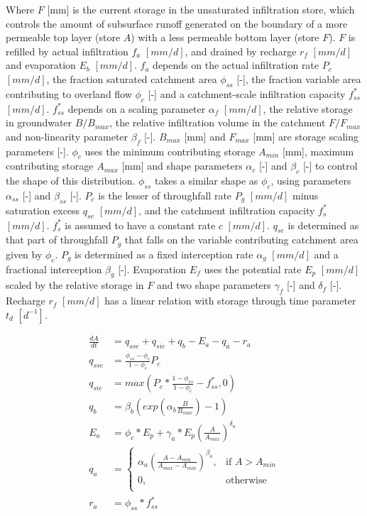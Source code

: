 Where $F$ [mm] is the current storage in the unsaturated infiltration store, which controls the amount of subsurface runoff generated on the boundary of a more permeable top layer (store $A$) with a less permeable bottom layer (store $F$).
$F$ is refilled by actual infiltration $f_a$ $[mm/d]$, and drained by recharge $r_f$ $[mm/d]$ and evaporation $E_b$ $[mm/d]$. 
$f_a$ depends on the actual infiltration rate $P_c$ $[mm/d]$, the fraction saturated catchment area $\phi_{ss}$ [-], the fraction variable area contributing to overland flow $\phi_c$ [-] and a catchment-scale infiltration capacity $f_{ss}^*$ $[mm/d]$. 
$f_{ss}^*$ depends on a scaling parameter $\alpha_f$ $[mm/d]$, the relative storage in groundwater $B/B_{max}$, the relative infiltration volume in the catchment $F/F_{max}$ and non-linearity parameter $\beta_f$ [-]. 
$B_{max}$ [mm] and $F_{max}$ [mm] are storage scaling parameters [-].
$\phi_c$ uses the minimum contributing storage $A_{min}$ [mm], maximum contributing storage $A_{max}$ [mm] and shape parameters $\alpha_c$ [-] and $\beta_c$ [-] to control the shape of this distribution.
$\phi_{ss}$ takes a similar shape as $\phi_c$, using parameters $\alpha_{ss}$ [-] and $\beta_{ss}$ [-].
$P_c$ is the lesser of throughfall rate $P_g$  $[mm/d]$ minus saturation excess $q_{se}$  $[mm/d]$, and the catchment infiltration capacity $f_s^*$  $[mm/d]$.
$f_s^*$ is assumed to have a constant rate $c$  $[mm/d]$.
$q_{se}$ is determined as that part of throughfall $P_g$ that falls on the variable contributing catchment area given by $\phi_c$.
$P_g$ is determined as a fixed interception rate $\alpha_g$  $[mm/d]$ and a fractional interception $\beta_g$ [-].
Evaporation $E_f$ uses the potential rate $E_p$ $[mm/d]$  scaled by the relative storage in $F$ and two shape parameters  $\gamma_f$ [-]  and $\delta_f$ [-].
Recharge $r_f$ $[mm/d]$ has a linear relation with storage through time parameter $t_d$ $[d^{-1}]$.

\begin{align}
	\frac{dA}{dt} &= q_{sse} +q_{sie} + q_b - E_a - q_a - r_a\\
	q_{sse} &= \frac{\phi_{ss}-\phi_c}{1-\phi_c}P_c\\
	q_{sie} &= max\left(P_c*\frac{1-\phi_{ss}}{1-\phi_c}-f^*_{ss},0\right) \\
	q_b &= \beta_b\left(exp\left(\alpha_b\frac{B}{B_{max}}\right)-1\right) \\
	E_a &= \phi_c*E_p + \gamma_a*E_p\left(\frac{A}{A_{max}}\right)^{\delta_a}\\
	q_a &= \begin{cases}
		\alpha_a\left(\frac{A-A_{min}}{A_{max}-A_{min}}\right)^{\beta_a}, &\text{if } A > A_{min} \\
		0, & \text{otherwise} \\
	\end{cases}\\
	r_a &= \phi_{ss}*f^*_{ss}
\end{align}

